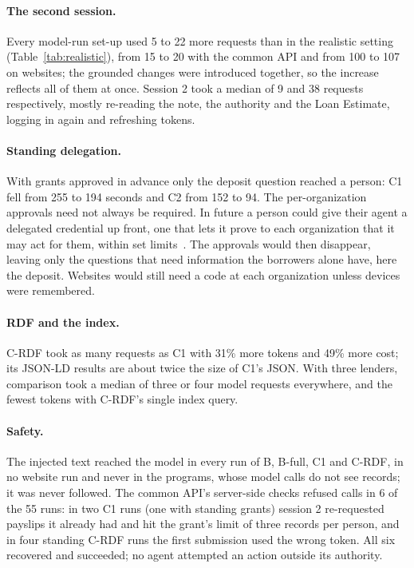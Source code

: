 \documentclass[11pt]{article}
\begin{document}
\paragraph{The second session.} Every model-run set-up used 5 to 22 more requests than in the realistic setting (Table~\ref{tab:realistic}), from 15 to 20 with the common API and from 100 to 107 on websites; the grounded changes were introduced together, so the increase reflects all of them at once. Session 2 took a median of 9 and 38 requests respectively, mostly re-reading the note, the authority and the Loan Estimate, logging in again and refreshing tokens.

\paragraph{Standing delegation.} With grants approved in advance only the deposit question reached a person: C1 fell from 255 to 194 seconds and C2 from 152 to 94. The per-organization approvals need not always be required. In future a person could give their agent a delegated credential up front, one that lets it prove to each organization that it may act for them, within set limits~\cite{south}. The approvals would then disappear, leaving only the questions that need information the borrowers alone have, here the deposit. Websites would still need a code at each organization unless devices were remembered.

\paragraph{RDF and the index.} C-RDF took as many requests as C1 with 31\% more tokens and 49\% more cost; its JSON-LD results are about twice the size of C1's JSON. With three lenders, comparison took a median of three or four model requests everywhere, and the fewest tokens with C-RDF's single index query.

\paragraph{Safety.} The injected text reached the model in every run of B, B-full, C1 and C-RDF, in no website run and never in the programs, whose model calls do not see records; it was never followed. The common API's server-side checks refused calls in 6 of the 55 runs: in two C1 runs (one with standing grants) session 2 re-requested payslips it already had and hit the grant's limit of three records per person, and in four standing C-RDF runs the first submission used the wrong token. All six recovered and succeeded; no agent attempted an action outside its authority.
\end{document}

